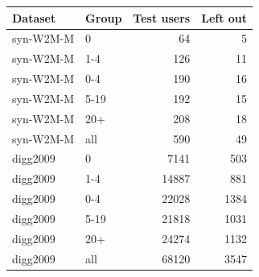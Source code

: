 \begin{tabular}{llrr}
\toprule
Dataset & Group & Test users & Left out \\
\midrule
syn-W2M-M & 0 & 64 & 5 \\
syn-W2M-M & 1-4 & 126 & 11 \\
syn-W2M-M & 0-4 & 190 & 16 \\
syn-W2M-M & 5-19 & 192 & 15 \\
syn-W2M-M & 20+ & 208 & 18 \\
syn-W2M-M & all & 590 & 49 \\
digg2009 & 0 & 7141 & 503 \\
digg2009 & 1-4 & 14887 & 881 \\
digg2009 & 0-4 & 22028 & 1384 \\
digg2009 & 5-19 & 21818 & 1031 \\
digg2009 & 20+ & 24274 & 1132 \\
digg2009 & all & 68120 & 3547 \\
\bottomrule
\end{tabular}

